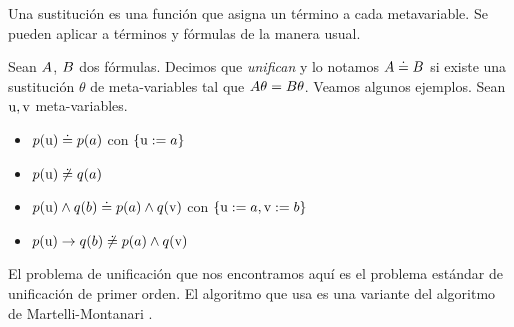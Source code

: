 \begin{definition}[Sustitución]
    Una sustitución es una función que asigna un término a cada metavariable. Se pueden aplicar a términos y fórmulas de la manera usual.
\end{definition}
    
\begin{definition}[Unificación]
    Sean $A$, $B$ dos fórmulas. Decimos que \textit{unifican} y lo
    notamos $A \doteq B$ si existe una sustitución $\theta$ de
    meta-variables tal que $A\theta = B\theta$. Veamos algunos ejemplos. Sean $\textrm{u}, \textrm{v}$ meta-variables.

    \begin{itemize}
    \item $p(\textrm{u}) \doteq p(a)$ con $\{\textrm{u} := a\}$
        \item $p(\textrm{u}) \not\doteq q(a)$
        \item $p(\textrm{u}) \wedge q(b) \doteq p(a) \wedge q(\textrm{v})$
        con $\{\textrm{u} := a, \textrm{v} := b\}$
        \item $p(\textrm{u}) \to q(b) \not\doteq p(a) \wedge q(\textrm{v})$
    \end{itemize}    
\end{definition}

\begin{obs*}
    El problema de unificación que nos encontramos aquí es el problema estándar de unificación de primer orden. El algoritmo que usa \ppaTool{} es una variante del algoritmo de Martelli-Montanari \cite{martelli-montanari-unification}.
\end{obs*}

